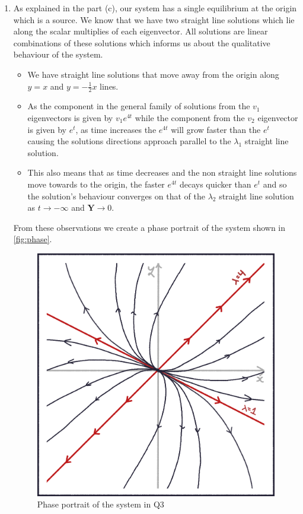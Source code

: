 \documentclass[a4paper, 11pt]{article}
\begin{document}
\begin{enumerate}[label=(\alph*)]
  \item As explained in the part (c), our system has a single equilibrium at the origin which is a source. We know that we have two straight line solutions which lie along the scalar multiplies of each eigenvector. All solutions are linear combinations of these solutions which informs us about the qualitative behaviour of the system. 
  \begin{itemize}
    \item We have straight line solutions that move away from the origin along $y=x$ and $y=-\frac12x$ lines. 
    \item As the component in the general family of solutions from the $v_1$ eigenvectors is given by $v_1e^{4t}$ while the component from the $v_2$ eigenvector is given by $e^t$, as time increases the $e^{4t}$ will grow faster than the $e^{t}$ causing the solutions directions approach parallel to the $\lambda_1$ straight line solution. 
    \item This also means that as time decreases and the non straight line solutions move towards to the origin, the faster $e^{4t}$ decays quicker than $e^t$ and so the solution's behaviour converges on that of the $\lambda_2$ straight line solution as $t\to-\infty$ and $\mathbf{Y}\to0$.
  \end{itemize}
  From these observations we create a phase portrait of the system shown in \autoref{fig:phase}.

  \begin{figure}[H]
    \centering
    \begin{minipage}{0.5\textwidth}
    \includegraphics[width=\textwidth]{images/phase.png}
    \caption{Phase portrait of the system in Q3}
    \label{fig:phase}
    \end{minipage}
  \end{figure}


\end{enumerate}
\end{document}
